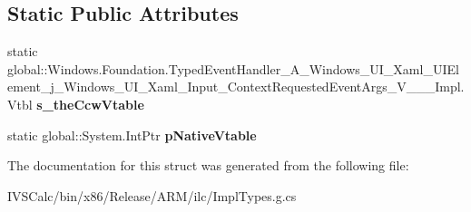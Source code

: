 \subsection*{Static Public Attributes}
\begin{DoxyCompactItemize}
\item 
\mbox{\label{struct_windows_1_1_foundation_1_1_typed_event_handler___a___windows___u_i___xaml___u_i_element__da1bc19a586bc8852d547ddd669460cf_a0269b6024470e46eae8126afed06b8e5}} 
static global\+::\+Windows.\+Foundation.\+Typed\+Event\+Handler\+\_\+\+A\+\_\+\+Windows\+\_\+\+U\+I\+\_\+\+Xaml\+\_\+\+U\+I\+Element\+\_\+j\+\_\+\+Windows\+\_\+\+U\+I\+\_\+\+Xaml\+\_\+\+Input\+\_\+\+Context\+Requested\+Event\+Args\+\_\+\+V\+\_\+\+\_\+\+\_\+\+Impl.\+Vtbl {\bfseries s\+\_\+the\+Ccw\+Vtable}
\item 
\mbox{\label{struct_windows_1_1_foundation_1_1_typed_event_handler___a___windows___u_i___xaml___u_i_element__da1bc19a586bc8852d547ddd669460cf_afe2e1da25b3b5656332f0318d52b504a}} 
static global\+::\+System.\+Int\+Ptr {\bfseries p\+Native\+Vtable}
\end{DoxyCompactItemize}


The documentation for this struct was generated from the following file\+:\begin{DoxyCompactItemize}
\item 
I\+V\+S\+Calc/bin/x86/\+Release/\+A\+R\+M/ilc/Impl\+Types.\+g.\+cs\end{DoxyCompactItemize}

